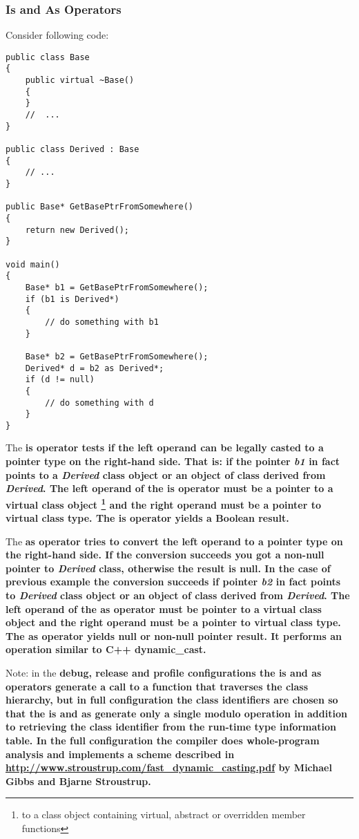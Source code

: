 \documentclass[a4paper,oneside,11pt]{article}
\begin{document}
\subsubsection{\bf{Is} and \bf{As} Operators}

Consider following code:

\begin{lstlisting}[frame=trBL]
public class Base
{
    public virtual ~Base()
    {
    }
    //  ...
}

public class Derived : Base
{
    // ...
}

public Base* GetBasePtrFromSomewhere()
{
    return new Derived();
}

void main()
{
    Base* b1 = GetBasePtrFromSomewhere();
    if (b1 is Derived*)
    {
        // do something with b1
    }

    Base* b2 = GetBasePtrFromSomewhere();
    Derived* d = b2 as Derived*;
    if (d != null)
    {
        // do something with d
    }
}

\end{lstlisting}

The \bf{is} operator tests if the left operand can be legally casted to a pointer type on the right-hand side.
That is: if the pointer \emph{b1} in fact points to a \emph{Derived} class object or an object of class derived from \emph{Derived}.
The left operand of the \bf{is} operator must be a pointer to a virtual class object
\footnote{to a class object containing virtual, abstract or overridden member functions}
and the right operand must be a pointer to virtual class type. The \bf{is} operator yields a Boolean result.

The \bf{as} operator tries to convert the left operand to a pointer type on the right-hand side.
If the conversion succeeds you got a non-null pointer to \emph{Derived} class, otherwise the result is \bf{null}.
In the case of previous example the conversion succeeds if pointer \emph{b2} in fact points to \emph{Derived} class object or an object of class derived
from \emph{Derived}.
The left operand of the \bf{as} operator must be pointer to a virtual class object and the right operand must be a pointer to virtual class type.
The \bf{as} operator yields \bf{null} or non-null pointer result. It performs an operation similar to C++ \bf{dynamic\_cast}.

Note: in the \bf{debug}, \bf{release} and \bf{profile} configurations the \bf{is} and \bf{as} operators generate a call to a function
that traverses the class hierarchy, but in \bf{full} configuration the class identifiers are chosen so that the \bf{is} and \bf{as} generate only
a single modulo operation in addition to retrieving the class identifier from the run-time type information table.
In the \bf{full} configuration the compiler does whole-program analysis and implements a scheme described in
\url {http://www.stroustrup.com/fast_dynamic_casting.pdf} by Michael Gibbs and Bjarne Stroustrup.
\end{document}
